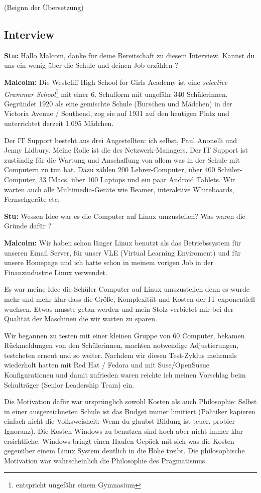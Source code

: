 (Beignn der Übersetzung)

\subsection*{Interview}
\textbf{Stu:} Hallo Malcom, danke für deine Bereitschaft zu diesem Interview. Kannst du uns ein wenig über die Schule und deinen Job erzählen ?

\textbf{Malcolm:} Die Westcliff High School for Girls Academy ist  eine \textit{selective Grammar School}\footnote{entspricht ungefähr einem Gymnasium} mit einer 6. Schulform mit ungefähr 340 Schülerinnen. Gegründet 1920 als eine gemischte Schule (Burschen und Mädchen) in der Victoria Avenue / Southend, zog sie auf 1931 auf den heutigen Platz und unterrichtet derzeit 1.095 Mädchen.

Der IT Support besteht aus drei Angestellten: ich selbst, Paul Anonelli und Jenny Lidbury. Meine Rolle ist die des Netzwerk-Managers. Der IT Support ist zuständig für die Wartung und Anschaffung von allem was in der Schule mit Computern zu tun hat. Dazu zählen 200 Lehrer-Computer, über 400 Schüler-Computer, 33 IMacs, über 100 Laptops und ein paar Android Tablets. Wir warten auch alle Multimedia-Geräte wie Beamer, interaktive Whiteboards, Fernsehgeräte etc.

\textbf{Stu:} Wessen Idee war es die Computer auf Linux umzustellen? Was waren die Gründe dafür ?

\textbf{Malcolm:} Wir haben schon länger Linux benutzt als das Betriebssystem für unseren Email Server, für unser VLE (Virtual Learning Enviroment) und für unsere Homepage und ich hatte schon in meinem vorigen Job in der Finanzindustrie Linux verwendet. 

Es war meine Idee die Schüler Computer auf Linux umszustellen denn es wurde mehr und mehr klar dass die Größe, Komplexität und Kosten der IT exponentiell wuchsen. Etwas musste getan werden und mein Stolz verbietet mir bei der Qualität der Maschinen die wir warten zu sparen. 

Wir begannen zu testen mit einer kleinen Gruppe von 60 Computer, bekamen Rückmeldungen von den Schülerinnen, machten notwendige Adjustierungen, testcheten erneut und so weiter. Nachdem wir diesen Test-Zyklus mehrmals wiederholt hatten mit Red Hat / Fedora und mit Suse/OpenSusue Konfigurationen und damit zufrieden waren reichte ich meinen Vorschlag beim Schulträger (Senior Leadership Team) ein.

Die Motivation dafür war ursprünglich sowohl Kosten als auch Philosophie: Selbst in einer ausgezeichneten Schule ist das Budget immer limitiert (Politiker kapieren einfach nicht die Volksweisheit: Wenn du glaubst Bildung ist teuer, probier Ignoranz). Die Kosten Windows zu benutzen sind hoch aber nicht immer klar ersichtliche. Windows bringt einen Haufen Gepäck mit sich was die Kosten gegenüber einem Linux System deutlich in die Höhe treibt. Die philosophische Motivation war wahrscheinlich die Philosophie des Pragmatismus.

